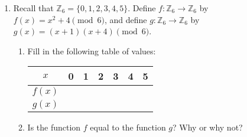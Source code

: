 \documentclass[11pt]{article}
\begin{document}
\begin{enumerate}
	
	\item Recall that $\mathbb{Z}_6 = \{0, 1, 2, 3, 4, 5\}$. Define $f: \mathbb{Z}_6 \rightarrow \mathbb{Z}_6$ by $f(x) = x^2 + 4 \pmod 6$, and define $g: \mathbb{Z}_6 \rightarrow \mathbb{Z}_6$ by $g(x) = (x+1)(x+4) \pmod 6$. 
		\begin{enumerate}
			\item Fill in the following table of values: 
			
			\begin{center}
				\begin{tabular}{c||cccccc}
				$x$ & 0 & 1 & 2 & 3 & 4 & 5 \\ \hline
				$f(x)$ & & & & & & \\ \hline
				$g(x)$ & & & & & & 
				\end{tabular}
			\end{center}
			
			
			\item Is the function $f$ equal to the function $g$? Why or why not? 
		\end{enumerate}



\end{enumerate}
\end{document}
